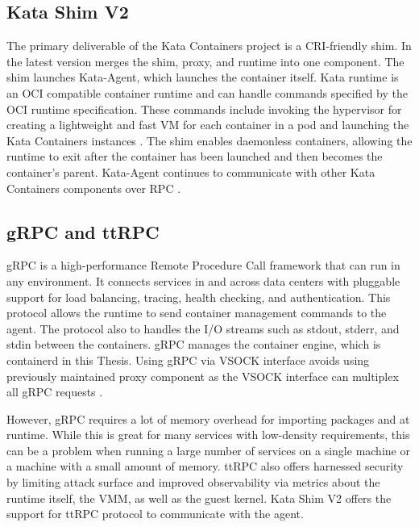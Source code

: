 \subsection{Kata Shim V2}

The primary deliverable of the Kata Containers project is a CRI-friendly shim. In the latest version merges the shim, proxy, and runtime into one component. The shim launches Kata-Agent, which launches the container itself. Kata runtime is an OCI compatible container runtime and can handle commands specified by the OCI runtime specification. These commands include invoking the hypervisor for creating a lightweight and fast VM for each container in a pod and launching the Kata Containers instances \cite{Randazzo2019}. The shim enables daemonless containers, allowing the runtime to exit after the container has been launched and then becomes the container's parent. Kata-Agent continues to communicate with other Kata Containers components over RPC \cite{KataContainersArchitecture}. \cite{Crosby}

\subsection{gRPC and ttRPC}

gRPC is a high-performance Remote Procedure Call framework that can run in any environment. It connects services in and across data centers with pluggable support for load balancing, tracing, health checking, and authentication. This protocol allows the runtime to send container management commands to the agent. The protocol also to handles the I/O streams such as stdout, stderr, and stdin between the containers.
gRPC manages the container engine, which is containerd in this Thesis. Using gRPC via VSOCK interface avoids using previously maintained proxy component as the VSOCK interface can multiplex all gRPC requests \cite{Randazzo2019}. \cite{gRPC}\cite{KataContainersArchitecture}

However, gRPC requires a lot of memory overhead for importing packages and at runtime. While this is great for many services with low-density requirements, this can be a problem when running a large number of services on a single machine or a machine with a small amount of memory. ttRPC also offers harnessed security by limiting attack surface and improved observability via metrics about the runtime itself, the VMM, as well as the guest kernel. Kata Shim V2 offers the support for ttRPC protocol to communicate with the agent. \cite{ttRPC}

